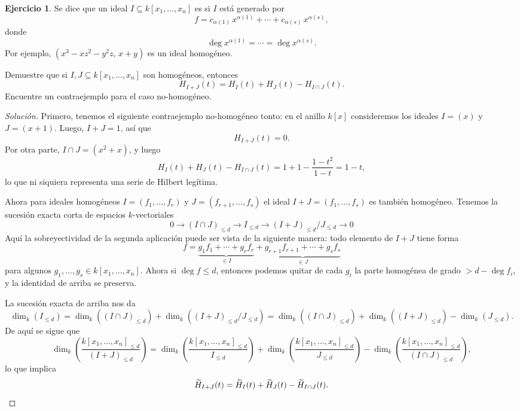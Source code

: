 \documentclass{article}
\theoremstyle{definition}
\newtheorem{ejerc}{Ejercicio}
\newenvironment{solucion}{\begin{proof}[Solución]}{\end{proof}}
\begin{document}
\begin{ejerc}
  Se dice que un ideal $I \subseteq k [x_1,\ldots,x_n]$ es  si
  $I$ está generado por 
  $$f = c_{\alpha (1)}\,x^{\alpha (1)} + \cdots + c_{\alpha (s)}\,x^{\alpha (s)},$$
  donde
  $$\deg x^{\alpha (1)} = \cdots = \deg x^{\alpha (s)}.$$
  Por ejemplo, $(x^3 - xz^2 - y^2z, \, x+y)$ es un ideal homogéneo.

  Demuestre que si $I, J \subseteq k [x_1,\ldots,x_n]$ son homogéneos, entonces
  $$H_{I+J} (t) = H_I (t) + H_J (t) - H_{I\cap J} (t).$$
  Encuentre un contraejemplo para el caso no-homogéneo.

  \ifdefined\solutions\begin{solucion}
    Primero, tenemos el siguiente contraejemplo no-homogéneo tonto: en el anillo
    $k [x]$ consideremos los ideales $I = (x)$ y $J = (x+1)$. Luego,
    $I + J = 1$, así que
    $$H_{I+J} (t) = 0.$$
    Por otra parte, $I\cap J = (x^2+x)$, y luego
    $$H_I (t) + H_J (t) - H_{I\cap J} (t) = 1 + 1 - \frac{1-t^2}{1-t} = 1-t,$$
    lo que ni siquiera representa una serie de Hilbert legítima.

    \vspace{1em}

    Ahora para ideales homogéneos $I = (f_1,\ldots,f_r)$ y
    $J = (f_{r+1},\ldots,f_s)$ el ideal $I + J = (f_1,\ldots,f_s)$ es también
    homogéneo. Tenemos la sucesión exacta corta de espacios $k$-vectoriales
    $$0 \to (I \cap J)_{\le d} \to I_{\le d} \to (I+J)_{\le d}/J_{\le d} \to 0$$
    Aquí la sobreyectividad de la segunda aplicación puede ser vista de la
    siguiente manera: todo elemento de $I+J$ tiene forma
    \[ f = \underbrace{g_1 f_1 + \cdots + g_r f_r}_{\in I} +
           \underbrace{g_{r+1} f_{r+1} + \cdots + g_s f_s}_{\in J} \]
    para algunos $g_1,\ldots,g_s \in k [x_1,\ldots,x_n]$. Ahora si
    $\deg f \le d$, entonces podemos quitar de cada $g_i$ la parte homogénea de
    grado $> d - \deg f_i$, y la identidad de arriba se preserva.

    La sucesión exacta de arriba nos da
    \[ \dim_k (I_{\le d}) =
       \dim_k ((I\cap J)_{\le d}) + \dim_k ((I+J)_{\le d}/J_{\le d}) =
       \dim_k ((I\cap J)_{\le d}) + \dim_k ((I+J)_{\le d}) - \dim_k (J_{\le d}). \]
    De aquí se sigue que
    \[ \dim_k \left(\frac{k[x_1,\ldots,x_n]_{\le d}}{(I+J)_{\le d}}\right) =
       \dim_k \left(\frac{k[x_1,\ldots,x_n]_{\le d}}{I_{\le d}}\right) +
       \dim_k \left(\frac{k[x_1,\ldots,x_n]_{\le d}}{J_{\le d}}\right) -
       \dim_k \left(\frac{k[x_1,\ldots,x_n]_{\le d}}{(I\cap J)_{\le d}}\right), \]
    lo que implica
    \[ \widetilde{H}_{I+J} (t) =
         \widetilde{H}_I (t) +
         \widetilde{H}_J (t) -
         \widetilde{H}_{I\cap J} (t). \qedhere \]
  \end{solucion}\fi
\end{ejerc}
\end{document}

